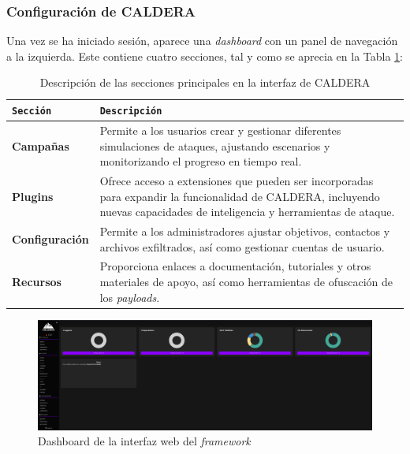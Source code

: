\subsubsection{Configuración de \gls{CALDERA}}

Una vez se ha iniciado sesión, aparece una \textit{dashboard} con un panel de navegación a la izquierda. Este contiene cuatro secciones, tal y como se aprecia en la Tabla \ref{tab:caldera-sections}:

\begin{table}[H]
\centering
\footnotesize
\begin{tabularx}{\textwidth}{|X|X|}
\hline
\rowcolor{graylight}\texttt{Sección} & \texttt{Descripción} \\
\hline
\textbf{Campañas} & Permite a los usuarios crear y gestionar diferentes simulaciones de ataques, ajustando escenarios y monitorizando el progreso en tiempo real. \\
\hline
\textbf{Plugins} & Ofrece acceso a extensiones que pueden ser incorporadas para expandir la funcionalidad de CALDERA, incluyendo nuevas capacidades de inteligencia y herramientas de ataque. \\
\hline
\textbf{Configuración} & Permite a los administradores ajustar objetivos, contactos y archivos exfiltrados, así como gestionar cuentas de usuario. \\
\hline
\textbf{Recursos} & Proporciona enlaces a documentación, tutoriales y otros materiales de apoyo, así como herramientas de ofuscación de los \textit{payloads}. \\
\hline
\end{tabularx}
\caption{Descripción de las secciones principales en la interfaz de CALDERA}
\label{tab:caldera-sections}
\end{table}


\begin{figure}[H]
    \centering
    \includegraphics[width=1\linewidth]{imagenes/caldera-dashboard.png}
    \caption{Dashboard de la interfaz web del \textit{framework}}
    \label{fig:enter-label}
\end{figure}

